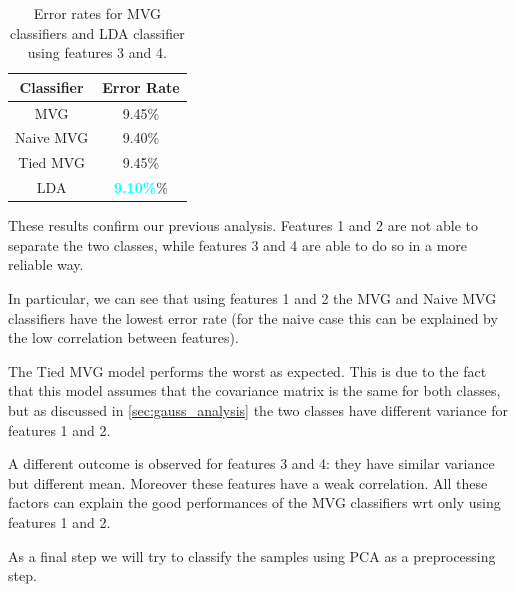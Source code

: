 \documentclass[12pt]{report}
\newcommand{\nnl}{%
    \newline
    \newline
}
\newcommand{\nl}{%
    \newline
    \noindent
}
\begin{document}
\begin{table}[H]
    \centering
    \begin{tabular}{|c|c|}
        \hline
        \rowcolor{blue!10}
        \textbf{Classifier} & \textbf{Error Rate}                 \\
        \hline
        MVG                 & 9.45\%                              \\
        \hline
        Naive MVG           & 9.40\%                              \\
        \hline
        Tied MVG            & 9.45\%                              \\
        \hline
        LDA                 & \textcolor{cyan}{\textbf{9.10\%}}\% \\
        \hline
    \end{tabular}
    \caption{Error rates for MVG classifiers and LDA classifier using features 3 and 4.}
    \label{tab:MVG_error_3_4}
\end{table}
\noindent
These results confirm our previous analysis. Features 1 and 2 are not able to separate the two classes, while features 3 and 4 are able to do so in a more reliable way.
\nl
In particular, we can see that using features 1 and 2 the MVG and Naive MVG classifiers have the lowest error rate (for the naive case this can be explained by the low correlation between features).
\nl
The Tied MVG model performs the worst as expected. This is due to the fact that this model assumes that the covariance matrix is the same for both classes, but as discussed in \autoref{sec:gauss_analysis} the two classes have different variance for features 1 and 2.
\nl
A different outcome is observed for features 3 and 4: they have similar variance but different mean. Moreover these features have a weak correlation. All these factors can explain the good performances of the MVG classifiers wrt only using features 1 and 2.
\nnl
As a final step we will try to classify the samples using PCA as a preprocessing step.
\end{document}
